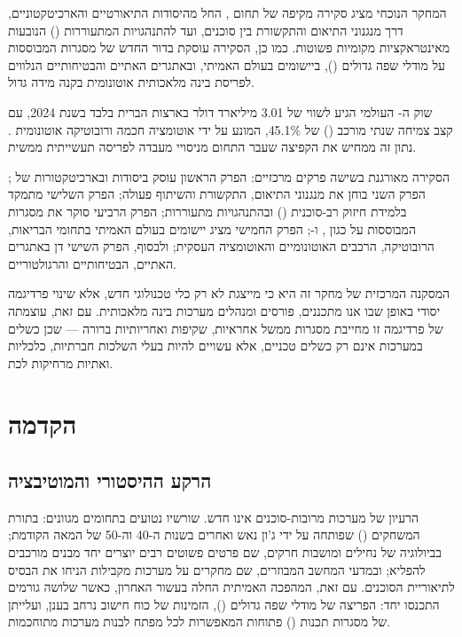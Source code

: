 \documentclass[12pt,a4paper]{article}
\begin{document}
המחקר הנוכחי מציג סקירה מקיפה של תחום , החל מהיסודות התיאורטיים והארכיטקטוניים, דרך מנגנוני התיאום והתקשורת בין סוכנים, ועד להתנהגויות המתעוררות () הנובעות מאינטראקציות מקומיות פשוטות. כמו כן, הסקירה עוסקת בדור החדש של מסגרות  המבוססות על מודלי שפה גדולים (), ביישומים בעולם האמיתי, ובאתגרים האתיים והבטיחותיים הנלווים לפריסת בינה מלאכותית אוטונומית בקנה מידה גדול.

שוק ה- העולמי הגיע לשווי של 3.01 מיליארד דולר בארצות הברית בלבד בשנת 2024, עם קצב צמיחה שנתי מורכב () של 45.1\%, המונע על ידי אוטומציה חכמה ורובוטיקה אוטונומית \cite{MarketUS2024}. נתון זה ממחיש את הקפיצה שעבר התחום מניסויי מעבדה לפריסה תעשייתית ממשית.

הסקירה מאורגנת בשישה פרקים מרכזיים: הפרק הראשון עוסק ביסודות ובארכיטקטורות של ; הפרק השני בוחן את מנגנוני התיאום, התקשורת והשיתוף פעולה; הפרק השלישי מתמקד בלמידת חיזוק רב-סוכנית () ובהתנהגויות מתעוררות; הפרק הרביעי סוקר את מסגרות  המבוססות על  כגון ,  ו-; הפרק החמישי מציג יישומים בעולם האמיתי בתחומי הבריאות, הרובוטיקה, הרכבים האוטונומיים והאוטומציה העסקית; ולבסוף, הפרק השישי דן באתגרים האתיים, הבטיחותיים והרגולטוריים.

המסקנה המרכזית של מחקר זה היא כי  מייצגת לא רק כלי טכנולוגי חדש, אלא שינוי פרדיגמה יסודי באופן שבו אנו מתכננים, פורסים ומנהלים מערכות בינה מלאכותית. עם זאת, עוצמתה של פרדיגמה זו מחייבת מסגרות ממשל אחראיות, שקיפות ואחריותיות ברורה --- שכן כשלים במערכות  אינם רק כשלים טכניים, אלא עשויים להיות בעלי השלכות חברתיות, כלכליות ואתיות מרחיקות לכת.

\newpage

\section{הקדמה}

\subsection{הרקע ההיסטורי והמוטיבציה}

הרעיון של מערכות מרובות-סוכנים אינו חדש. שורשיו נטועים בתחומים מגוונים: בתורת המשחקים () שפותחה על ידי ג'ון נאש ואחרים בשנות ה-40 וה-50 של המאה הקודמת; בביולוגיה של נחילים ומושבות חרקים, שם פרטים פשוטים רבים יוצרים יחד מבנים מורכבים להפליא; ובמדעי המחשב המבוזרים, שם מחקרים על מערכות מקבילות הניחו את הבסיס לתיאוריית הסוכנים. עם זאת, המהפכה האמיתית החלה בעשור האחרון, כאשר שלושה גורמים התכנסו יחד: הפריצה של מודלי שפה גדולים (), הזמינות של כוח חישוב נרחב בענן, ועלייתן של מסגרות תכנות () פתוחות המאפשרות לכל מפתח לבנות מערכות  מתוחכמות.
\end{document}
